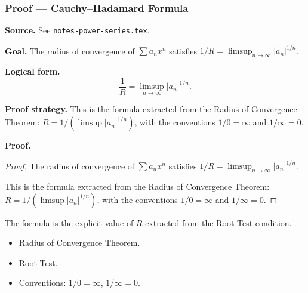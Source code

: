 
\clearpage
{}
\hypertarget{proof-RA-ABB-T-cauchy-hadamard}{}

\subsubsection[Cauchy--Hadamard Formula]{Proof --- Cauchy--Hadamard Formula}

\bigskip

\noindent
\textbf{Source.} See \texttt{notes-power-series.tex}.

\vspace{0.75em}

\noindent
\textbf{Goal.} The radius of convergence of $\sum a_n x^n$ satisfies $1/R = \limsup_{n\to\infty} |a_n|^{1/n}$.

\vspace{0.75em}

\noindent
\textbf{Logical form.}
\[
  \frac{1}{R} = \limsup_{n\to\infty} |a_n|^{1/n}.
\]

\vspace{0.75em}

\noindent
\textbf{Proof strategy.} This is the formula extracted from the Radius of Convergence Theorem: $R = 1/(\limsup |a_n|^{1/n})$, with the conventions $1/0 = \infty$ and $1/\infty = 0$.

\vspace{0.75em}

\noindent
\textbf{Proof.}
\begin{proof}
\Claim The radius of convergence of $\sum a_n x^n$ satisfies $1/R = \limsup_{n\to\infty} |a_n|^{1/n}$.

\Given 

\Goal 

\Strategy This is the formula extracted from the Radius of Convergence Theorem: $R = 1/(\limsup |a_n|^{1/n})$, with the conventions $1/0 = \infty$ and $1/\infty = 0$.

\medskip


\end{proof}

\begin{remark*}
The formula is the explicit value of $R$ extracted from the Root Test condition.
\end{remark*}

\begin{remark*}[Dependencies]
\begin{itemize}
  \item Radius of Convergence Theorem.
  \item Root Test.
  \item Conventions: $1/0 = \infty$, $1/\infty = 0$.
\end{itemize}
\end{remark*}
